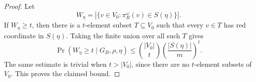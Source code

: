 \begin{proof}
Let
\[
W_\eta=|\{v\in V_0:\pi_R^\omega(v)\in S(\eta)\}|.
\]
If \(W_\eta\ge t\), then there is a \(t\)-element subset
\(T\subseteq V_0\) such that every \(v\in T\) has red coordinate in
\(S(\eta)\).  Taking the finite union over all such \(T\) gives
\[
\Pr(W_\eta\ge t\mid G_B,\rho,\eta)
\le \binom{|V_0|}{t}\left(\frac{|S(\eta)|}{m}\right)^t.
\]
The same estimate is trivial when \(t>|V_0|\), since there are no
\(t\)-element subsets of \(V_0\).  This proves the claimed bound.
\end{proof}
